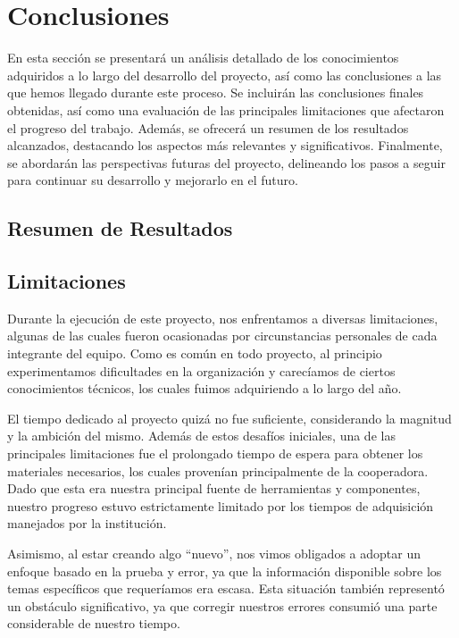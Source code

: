 \documentclass{article}
\begin{document}
\section{Conclusiones}
En esta sección se presentará un análisis detallado de los conocimientos adquiridos a lo largo del desarrollo del proyecto, así como las conclusiones a las que hemos llegado durante este proceso. Se incluirán las conclusiones finales obtenidas, así como una evaluación de las principales limitaciones que afectaron el progreso del trabajo. Además, se ofrecerá un resumen de los resultados alcanzados, destacando los aspectos más relevantes y significativos. Finalmente, se abordarán las perspectivas futuras del proyecto, delineando los pasos a seguir para continuar su desarrollo y mejorarlo en el futuro.


\subsection{Resumen de Resultados}


\subsection{Limitaciones}
Durante la ejecución de este proyecto, nos enfrentamos a diversas limitaciones, algunas de las cuales fueron ocasionadas por circunstancias personales de cada integrante del equipo. Como es común en todo proyecto, al principio experimentamos dificultades en la organización y carecíamos de ciertos conocimientos técnicos, los cuales fuimos adquiriendo a lo largo del año.



El tiempo dedicado al proyecto quizá no fue suficiente, considerando la magnitud y la ambición del mismo. Además de estos desafíos iniciales, una de las principales limitaciones fue el prolongado tiempo de espera para obtener los materiales necesarios, los cuales provenían principalmente de la cooperadora. Dado que esta era nuestra principal fuente de herramientas y componentes, nuestro progreso estuvo estrictamente limitado por los tiempos de adquisición manejados por la institución.


Asimismo, al estar creando algo “nuevo”, nos vimos obligados a adoptar un enfoque basado en la prueba y error, ya que la información disponible sobre los temas específicos que requeríamos era escasa. Esta situación también representó un obstáculo significativo, ya que corregir nuestros errores consumió una parte considerable de nuestro tiempo.
\end{document}
